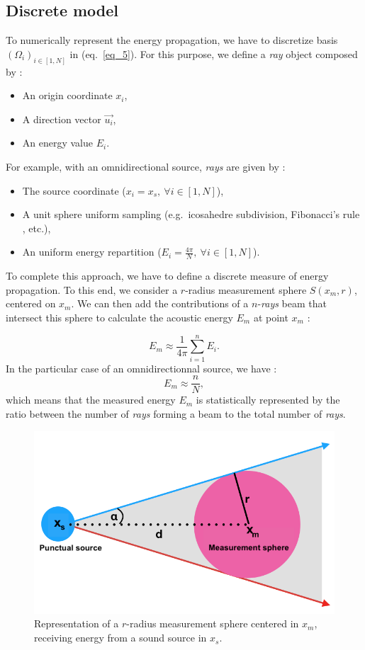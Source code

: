 \documentclass[AMA,STIX1COL]{WileyNJD-v2}
\begin{document}
\subsection{Discrete model}

To numerically represent the energy propagation, we have to discretize basis $(\Omega_i)_{i\in[1,N] }$ in (eq.~\ref{eq_5}). For this purpose, we define a \textit{ray} object composed by :
\begin{itemize}
\item An origin coordinate $x_i$,
\item A direction vector $\overrightarrow{u_i}$,
\item An energy value $E_i$.
\end{itemize}

For example, with an omnidirectional source, \textit{rays} are given by :
\begin{itemize}
\item The source coordinate ($x_i = x_s,~\forall i\in[1,N]$),
\item A unit sphere uniform sampling (e.g.~icosahedre subdivision, Fibonacci's rule \cite{fibonacci}, etc.),
\item An uniform energy repartition ($E_i = \frac{4\pi}{N},~\forall i\in[1,N]$).
\end{itemize}

To complete this approach, we have to define a discrete measure of energy propagation. To this end, we consider a $r$-radius measurement sphere $S(x_m, r)$, centered on $x_m$.  We can then add the contributions of a $n$-\textit{rays}  beam that intersect this sphere to calculate the acoustic energy $E_m$ at point $x_m$ :

\begin{equation}
E_m \approx  \frac{1}{4\pi}  \sum_{i=1}^n E_i.
\end{equation}
In the particular case of an omnidirectionnal source, we have : 
\begin{equation}
E_m \approx  \frac{n}{N},
\label{eq_7}
\end{equation}
which means that the measured energy $E_m$ is statistically represented by the ratio between the number of \textit{rays} forming a beam to the total number of \textit{rays}.

\begin{figure}[t]
\centering
	\includegraphics[width=0.6\linewidth]{schema_rayon}
	\caption{Representation of a $r$-radius measurement sphere centered in $x_m$, receiving energy from a sound source in $x_s$.}
	\label{schema_rayon}
\end{figure}
\end{document}
